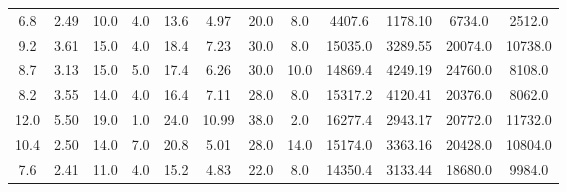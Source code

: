 \documentclass{article}
\begin{document}
\begin{table}[]
\begin{tabular}{cccccccccccc}
	     		6.8                        & 2.49                         & 10.0                     & 4.0                      & 13.6                      & 4.97                         & 20.0                     & 8.0                      & 4407.6                    & 1178.10                      & 6734.0                   & 2512.0                   \\
	     		9.2                        & 3.61                         & 15.0                     & 4.0                      & 18.4                      & 7.23                         & 30.0                     & 8.0                      & 15035.0                   & 3289.55                      & 20074.0                  & 10738.0                  \\
	     		8.7                        & 3.13                         & 15.0                     & 5.0                      & 17.4                      & 6.26                         & 30.0                     & 10.0                     & 14869.4                   & 4249.19                      & 24760.0                  & 8108.0                   \\
	     		8.2                        & 3.55                         & 14.0                     & 4.0                      & 16.4                      & 7.11                         & 28.0                     & 8.0                      & 15317.2                   & 4120.41                      & 20376.0                  & 8062.0                   \\
	     		12.0                       & 5.50                         & 19.0                     & 1.0                      & 24.0                      & 10.99                        & 38.0                     & 2.0                      & 16277.4                   & 2943.17                      & 20772.0                  & 11732.0                  \\
	     		10.4                       & 2.50                         & 14.0                     & 7.0                      & 20.8                      & 5.01                         & 28.0                     & 14.0                     & 15174.0                   & 3363.16                      & 20428.0                  & 10804.0                  \\
	     		7.6                        & 2.41                         & 11.0                     & 4.0                      & 15.2                      & 4.83                         & 22.0                     & 8.0                      & 14350.4                   & 3133.44                      & 18680.0                  & 9984.0                   \\

\end{tabular}
\end{table}
\end{document}
